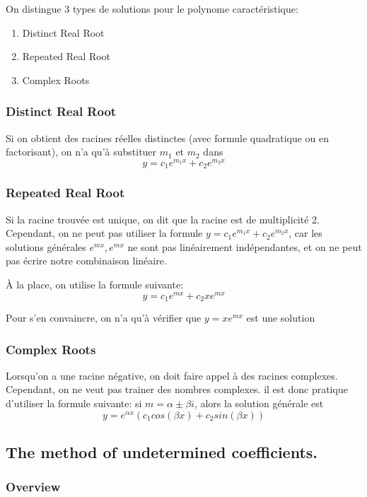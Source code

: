 \documentclass{article}
\begin{document}
On distingue 3 types de solutions pour le polynome caractéristique:
\begin{enumerate}
    \item Distinct Real Root
    \item Repeated Real Root
    \item Complex Roots
\end{enumerate}

\subsubsection{Distinct Real Root}

Si on obtient des racines réelles distinctes (avec formule quadratique
ou en factorisant), on n'a qu'à substituer $m_1$ et $m_2$ dans
$$ y= c_1 e^{m_1x}+c_2 e^{m_2x} $$

\subsubsection{Repeated Real Root}

Si la racine trouvée est unique, on dit que la racine est de multiplicité
2. Cependant, on ne peut pas utiliser la formule
$ y= c_1 e^{m_1x}+c_2 e^{m_2x} $, car les solutions générales
${e^{mx}, e^{mx}}$ ne sont pas linéairement indépendantes, et on ne
peut pas écrire notre combinaison linéaire.

À la place, on utilise la formule suivante:
$$ y= c_1 e^{mx}+c_2 xe^{mx} $$

Pour s'en convaincre, on n'a qu'à vérifier que $y=xe^{mx}$ est une
solution

\subsubsection{Complex Roots}

Lorsqu'on a une racine négative, on doit faire appel à des racines
complexes. Cependant, on ne veut pas trainer des nombres complexes.
il est donc pratique d'utiliser la formule suivante:
si $ m = \alpha \pm \beta i$, alors la solution générale est
$$ y = e^ {\alpha x} (c_1 cos(\beta x) + c_2 sin(\beta x)) $$

\subsection{The method of undetermined coefficients.}

\subsubsection{Overview}%
\label{ssub:Overview}
\end{document}
